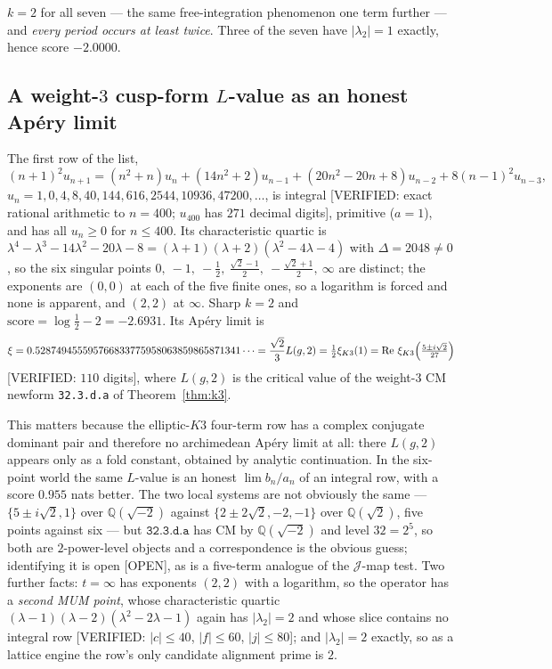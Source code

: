 \documentclass[11pt,reqno]{amsart}
\theoremstyle{plain}
\theoremstyle{definition}
\theoremstyle{remark}
\theoremstyle{plain}
\newcommand{\Q}{\mathbb{Q}}
\DeclareMathOperator{\re}{Re}
\newcommand{\Jm}{\mathcal J}
\newcommand{\Verified}[1]{\textup{\textsf{[VERIFIED: #1]}}}
\newcommand{\Open}{\textup{\textsf{[OPEN]}}}
\begin{document}
$k=2$ for all seven --- the same free-integration phenomenon one term further ---
and \emph{every period occurs at least twice}. Three of the seven have
$|\lambda_2|=1$ exactly, hence score $-2.0000$.

\subsection{A weight-$3$ cusp-form $L$-value as an honest Ap\'ery limit}
The first row of the list,
\begin{equation}\label{eq:fiveterm}
(n+1)^2u_{n+1}=(n^2{+}n)u_n+(14n^2{+}2)u_{n-1}+(20n^2{-}20n{+}8)u_{n-2}
 +8(n{-}1)^2u_{n-3},
\end{equation}
$u_n=1,0,4,8,40,144,616,2544,10936,47200,\dots$, is integral \Verified{exact
rational arithmetic to $n=400$; $u_{400}$ has $271$ decimal digits}, primitive
($a=1$), and has all $u_n\ge0$ for $n\le400$. Its characteristic quartic is
$\lambda^4-\lambda^3-14\lambda^2-20\lambda-8=(\lambda+1)(\lambda+2)(\lambda^2-4\lambda-4)$
with $\Delta=2048\ne0$, so the six singular points
$0,\ -1,\ -\tfrac12,\ \tfrac{\sqrt2-1}2,\ -\tfrac{\sqrt2+1}2,\ \infty$ are
distinct; the exponents are $(0,0)$ at each of the five finite ones, so a
logarithm is forced and none is apparent, and $(2,2)$ at $\infty$. Sharp $k=2$
and $\text{score}=\log\tfrac12-2=-2.6931$. Its Ap\'ery limit is
\[
\xi=0.528749455595766833775958063859865871341\dots
=\frac{\sqrt2}{3}L(g,2)=\tfrac12\xi_{K3}(1)
=\re\,\xi_{K3}\Bigl(\tfrac{5\pm i\sqrt2}{27}\Bigr)
\]
\Verified{$110$ digits}, where $L(g,2)$ is the critical value of the weight-$3$
CM newform \texttt{32.3.d.a} of Theorem~\ref{thm:k3}.

This matters because the elliptic-$K3$ four-term row has a complex conjugate
dominant pair and therefore no archimedean Ap\'ery limit at all: there $L(g,2)$
appears only as a fold constant, obtained by analytic continuation. In the
six-point world the same $L$-value is an honest $\lim b_n/a_n$ of an integral
row, with a score $0.955$ nats better. The two local systems are not obviously
the same --- $\{5\pm i\sqrt2,1\}$ over $\Q(\sqrt{-2})$ against
$\{2\pm2\sqrt2,-2,-1\}$ over $\Q(\sqrt2)$, five points against six --- but
$\texttt{32.3.d.a}$ has CM by $\Q(\sqrt{-2})$ and level $32=2^5$, so both are
$2$-power-level objects and a correspondence is the obvious guess; identifying it
is open \Open, as is a five-term analogue of the $\Jm$-map test. Two further
facts: $t=\infty$ has exponents $(2,2)$ with a logarithm, so the operator has a
\emph{second MUM point}, whose characteristic quartic
$(\lambda-1)(\lambda-2)(\lambda^2-2\lambda-1)$ again has $|\lambda_2|=2$ and
whose slice contains no integral row \Verified{$|c|\le40$, $|f|\le60$,
$|j|\le80$}; and $|\lambda_2|=2$ exactly, so as a lattice engine the row's only
candidate alignment prime is $2$.
\end{document}
